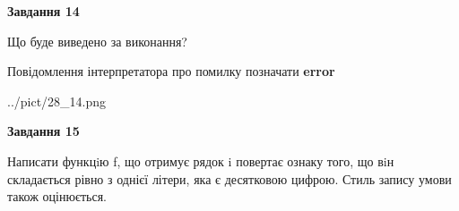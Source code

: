 \documentclass[11pt, ukrainian]{article}
\begin{document}
{\begin {large}
{\begin {center}\textbf{Завдання 14}\end {center}}\par
Що буде виведено за виконання? \par
Повідомлення інтерпретатора про помилку позначати \textbf{error}

\begin{center}
	{../pict/28_14.png}
\end{center}
\newpage

{\begin {center}\textbf{Завдання 15}\end {center}}\par

Написати функцiю f, що отримує рядок i повертає ознаку того, що вiн складається рівно з однієї літери, яка є десятковою цифрою. Стиль запису умови також оцінюється.\par
\newpage

\end {large}}
\end{document}
